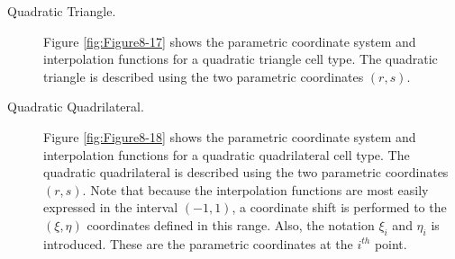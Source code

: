 \begin{description}
    \item[Quadratic Triangle.] Figure \ref{fig:Figure8-17} shows the parametric coordinate system and interpolation functions for a quadratic triangle cell type. The quadratic triangle is described using the two parametric coordinates $(r,s)$.

    \item[Quadratic Quadrilateral.] Figure \ref{fig:Figure8-18} shows the parametric coordinate system and interpolation functions for a quadratic quadrilateral cell type. The quadratic quadrilateral is described using the two parametric coordinates $(r,s)$. Note that because the interpolation functions are most easily expressed in the interval $(-1,1)$, a coordinate shift is performed to the $(\xi, \eta)$ coordinates defined in this range. Also, the notation $\xi_i$ and $\eta_i$ is introduced. These are the parametric coordinates at the $i^{th}$ point.


\end{description}
